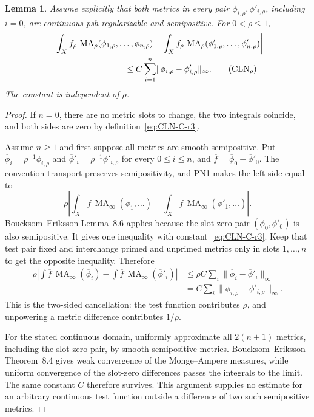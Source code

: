 \documentclass[11pt]{article}
\newtheorem{lemma}[theorem]{Lemma}
\newcommand{\MA}{\operatorname{MA}}
\newcommand{\norm}[1]{\lVert#1\rVert}
\begin{document}
\begin{lemma}
\label{lem:CLN-r3}
Assume explicitly that both metrics in every pair
$\phi_{i,\rho},\phi'_{i,\rho}$, including $i=0$, are continuous
psh-regularizable and semipositive.  For $0<\rho\leq1$,
\begin{align}
 &\left|\int_Xf_\rho\,
 \MA_\rho(\phi_{1,\rho},\ldots,\phi_{n,\rho})
 -\int_Xf_\rho\,
 \MA_\rho(\phi'_{1,\rho},\ldots,\phi'_{n,\rho})\right|\notag\\
 &\hspace{30mm}\leq
 C\sum_{i=1}^n
 \norm{\phi_{i,\rho}-\phi'_{i,\rho}}_\infty.
\tag{CLN$_\rho$}\label{eq:CLN-r3}
\end{align}
The constant is independent of $\rho$.
\end{lemma}

\begin{proof}
If $n=0$, there are no metric slots to change, the two integrals coincide,
and both sides are zero by definition~\eqref{eq:CLN-C-r3}.

Assume $n\geq1$ and first suppose all metrics are smooth semipositive.
Put $\overline\phi_i=\rho^{-1}\phi_{i,\rho}$ and
$\overline\phi'_i=\rho^{-1}\phi'_{i,\rho}$ for every $0\leq i\leq n$,
and $\overline f=\overline\phi_0-\overline\phi'_0$.
The convention transport preserves semipositivity, and PN1 makes the left
side equal to
\[
 \rho\left|\int_X\overline f\,
 \MA_\infty(\overline\phi_1,\ldots)
 -\int_X\overline f\,
 \MA_\infty(\overline\phi'_1,\ldots)\right|.
\]
Boucksom--Eriksson Lemma~8.6 applies because the slot-zero pair
$(\overline\phi_0,\overline\phi'_0)$ is also semipositive.  It gives one
inequality with constant~\eqref{eq:CLN-C-r3}.  Keep that test pair fixed and
interchange primed and unprimed metrics only in slots $1,\ldots,n$ to get
the opposite inequality.  Therefore
\begin{align*}
 \rho\left|\int\overline f\,\MA_\infty(\overline\phi_i)
 -\int\overline f\,\MA_\infty(\overline\phi'_i)\right|
 &\leq\rho C\sum_i
 \norm{\overline\phi_i-\overline\phi'_i}_\infty\\
 &=C\sum_i
 \norm{\phi_{i,\rho}-\phi'_{i,\rho}}_\infty.
\end{align*}
This is the two-sided cancellation: the test function contributes $\rho$,
and unpowering a metric difference contributes $1/\rho$.

For the stated continuous domain, uniformly approximate all
$2(n+1)$ metrics, including the slot-zero pair, by smooth semipositive
metrics.  Boucksom--Eriksson Theorem~8.4 gives weak convergence of the
Monge--Ampere measures, while uniform convergence of the slot-zero
differences passes the integrals to the limit.  The same constant $C$
therefore survives.  This argument supplies no estimate for an arbitrary
continuous test function outside a difference of two such semipositive
metrics.
\end{proof}
\end{document}
